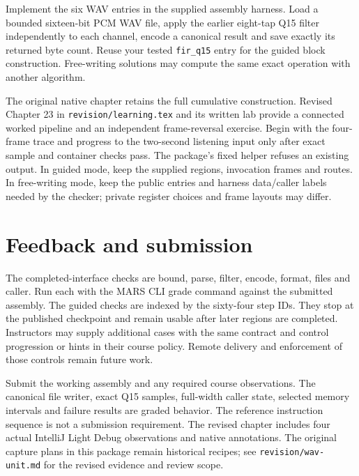 Implement the six WAV entries in the supplied assembly harness. Load a bounded
sixteen-bit PCM WAV file, apply the earlier eight-tap Q15 filter independently to each
channel, encode a canonical result and save exactly its returned byte count. Reuse your
tested \texttt{fir\_q15} entry for the guided block construction. Free-writing solutions
may compute the same exact operation with another algorithm.

The original native chapter retains the full cumulative construction. Revised
Chapter 23 in \texttt{revision/learning.tex} and its written lab provide a connected
worked pipeline and an independent frame-reversal exercise. Begin with the
four-frame trace and progress to the two-second listening input only after exact sample
and container checks pass. The package's fixed helper refuses an existing output.
In guided mode, keep the supplied regions, invocation frames and routes. In free-writing
mode, keep the public entries and harness data/caller labels needed by the checker;
private register choices and frame layouts may differ.






\section*{Feedback and submission}
The completed-interface checks are bound, parse, filter, encode, format, files and
caller. Run each with the MARS CLI grade command against the submitted assembly.
The guided checks are indexed by the sixty-four step IDs. They stop at the published
checkpoint and remain usable after later regions are completed. Instructors may supply
additional cases with the same contract and control progression or hints in their
course policy. Remote delivery and enforcement of those controls remain future work.

Submit the working assembly and any required course observations. The canonical file
writer, exact Q15 samples, full-width caller state, selected memory intervals and failure
results are graded behavior. The reference instruction sequence is not a submission
requirement. The revised chapter includes four actual IntelliJ Light Debug observations and
native annotations. The original capture plans in this package remain historical
recipes; see \texttt{revision/wav-unit.md} for the revised evidence and review scope.
